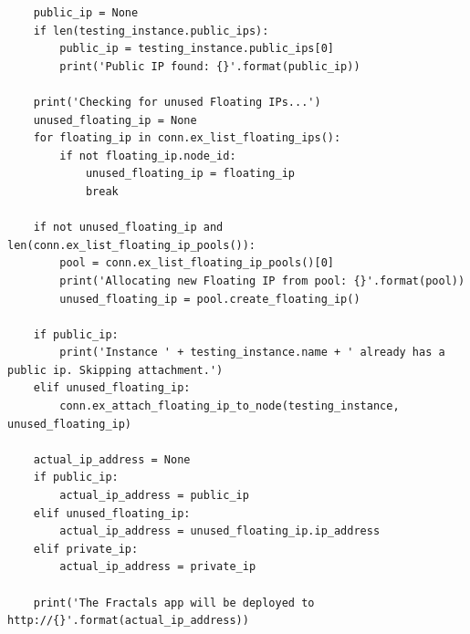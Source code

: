 \documentclass[12pt]{article}
\begin{document}
\begin{verbatim}
	public_ip = None
	if len(testing_instance.public_ips):
	    public_ip = testing_instance.public_ips[0]
	    print('Public IP found: {}'.format(public_ip))

	print('Checking for unused Floating IPs...')
	unused_floating_ip = None
	for floating_ip in conn.ex_list_floating_ips():
	    if not floating_ip.node_id:
	        unused_floating_ip = floating_ip
	        break

	if not unused_floating_ip and len(conn.ex_list_floating_ip_pools()):
	    pool = conn.ex_list_floating_ip_pools()[0]
	    print('Allocating new Floating IP from pool: {}'.format(pool))
	    unused_floating_ip = pool.create_floating_ip()

	if public_ip:
	    print('Instance ' + testing_instance.name + ' already has a public ip. Skipping attachment.')
	elif unused_floating_ip:
	    conn.ex_attach_floating_ip_to_node(testing_instance, unused_floating_ip)

	actual_ip_address = None
	if public_ip:
	    actual_ip_address = public_ip
	elif unused_floating_ip:
	    actual_ip_address = unused_floating_ip.ip_address
	elif private_ip:
	    actual_ip_address = private_ip

	print('The Fractals app will be deployed to http://{}'.format(actual_ip_address))
\end{verbatim}
\end{document}

